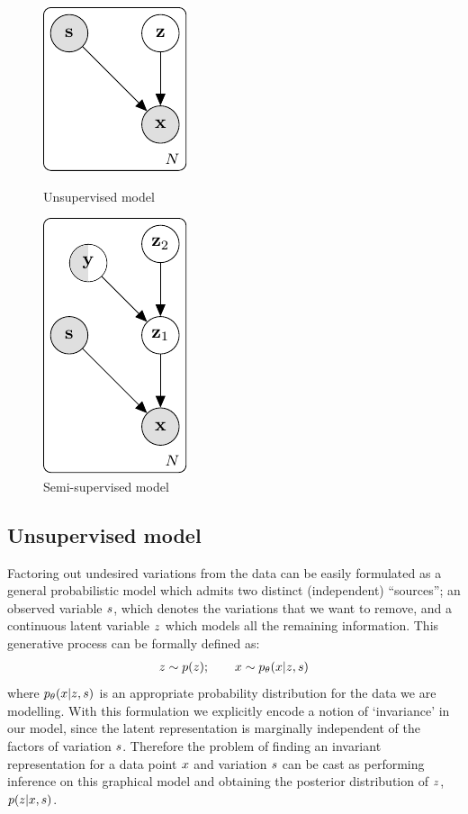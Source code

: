 \begin{figure}[ht]
    \begin{center}
        \begin{minipage}[b]{0.48\textwidth}
            \centering
            \includegraphics[scale=0.75]{unsupervised.pdf}
            \caption{Unsupervised model}
        \end{minipage}
        \quad
          \begin{minipage}[b]{0.48\textwidth}
            \centering
            \includegraphics[scale=0.75]{semisupervised.pdf}
            \caption{Semi-supervised model}
        \end{minipage}
    \end{center}
\end{figure}

\subsection{Unsupervised model}
Factoring out undesired variations from the data can be easily formulated as a general probabilistic model which admits two distinct (independent) ``sources''; an observed variable $\*s$, which denotes the variations that we want to remove, and a continuous latent variable $\*z$ which models all the remaining information.  This generative process can be formally defined as:
\begin{align*}
	\*z \sim p(\*z); \qquad \*x \sim p_\theta(\*x| \*z, \*s)
\end{align*}
where $p_\theta(\*x| \*z, \*s)$ is an appropriate probability distribution for the data we are modelling. With this formulation we explicitly encode a notion of `invariance' in our model, since the latent representation is marginally independent of the factors of variation $\*s$. Therefore the problem of finding an invariant representation for a data point $\*x$ and variation $\*s$ can be cast as performing inference on this graphical model and obtaining the posterior distribution of $\*z$, $p(\*z|\*x, \*s)$. 

